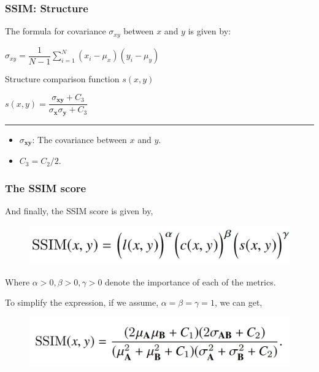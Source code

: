 \documentclass[13.5pt,aspecratio=169, xcolor=dvipsnames]{beamer}
\begin{document}
\begin{frame}
    \onehalfspacing
        \frametitle{SSIM: Structure}
        
        The formula for covariance {\Large $\sigma_{xy}$} between $x$ and $y$ is given by:
        \smallskip
        {\Large
        \begin{center}
            $ \sigma_{xy} = \dfrac{1}{N-1} \sum_{i=1}^{N} (x_i - \mu_x)(y_i - \mu_y)
              $
        \end{center}
        }

        \begin{block}{Structure comparison function $s(x,y)$}
            {\Large
            \begin{center}
                $ s(x,y) = \dfrac{\sigma_{\textbf{xy}} + C_3}{\sigma_{\textbf{x}} \sigma_{\textbf{y}} + C_3} $
            \end{center}
            }
            \hspace{8em}\rule{0.5\textwidth}{0.4pt}
            \begin{itemize}
                \item {\Large $\sigma_{\textbf{xy}}$}: The covariance between $x$ and $y$.
                \item $C_3 = C_2 / 2$.
            \end{itemize}
        \end{block}
        
        
      
\end{frame}
    

\begin{frame}
    \onehalfspacing
        \frametitle{The SSIM score}
        
        And finally, the SSIM score is given by,
        \begin{figure}
            \centering
            \includegraphics[width=0.8\linewidth]{SSIM_Formula.jpg}
        \end{figure}
            \begin{block}{}
                Where $\alpha > 0, \beta > 0, \gamma > 0$ denote the importance of each of the metrics. 
            \end{block}

        To simplify the expression, if we assume, $\alpha = \beta = \gamma = 1$, we can get,
        \begin{figure}
            \centering
            \includegraphics[width=0.8\linewidth]{SSIM_Formula_Simp.jpg}
        \end{figure}
        
\end{frame}
    
\end{document}
